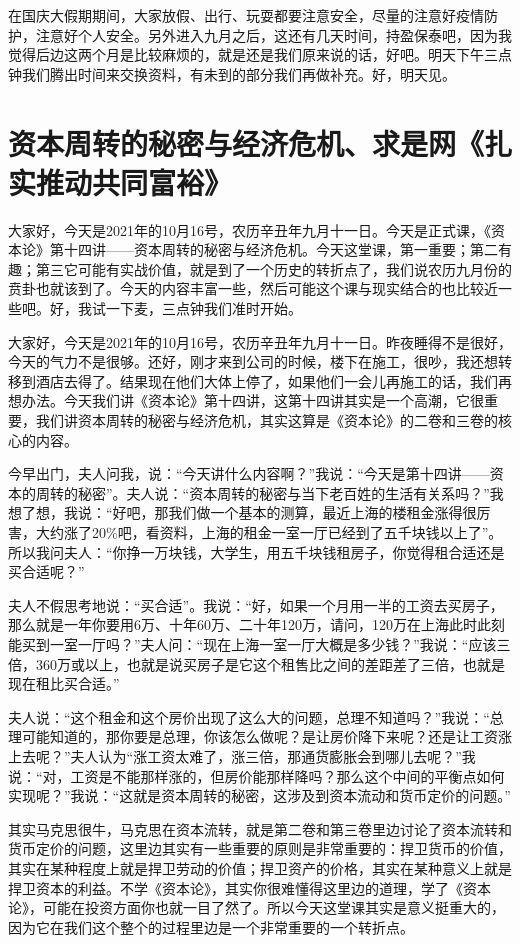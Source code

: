 \documentclass[UTF8, 12pt, a4paper]{ctexrep}
\begin{document}
在国庆大假期期间，大家放假、出行、玩耍都要注意安全，尽量的注意好疫情防护，注意好个人安全。另外进入九月之后，这还有几天时间，持盈保泰吧，因为我觉得后边这两个月是比较麻烦的，就是还是我们原来说的话，好吧。明天下午三点钟我们腾出时间来交换资料，有未到的部分我们再做补充。好，明天见。

\section{资本周转的秘密与经济危机、求是网《扎实推动共同富裕》}

大家好，今天是2021年的10月16号，农历辛丑年九月十一日。今天是正式课，《资本论》第十四讲——资本周转的秘密与经济危机。今天这堂课，第一重要；第二有趣；第三它可能有实战价值，就是到了一个历史的转折点了，我们说农历九月份的贲卦也就该到了。今天的内容丰富一些，然后可能这个课与现实结合的也比较近一些吧。好，我试一下麦，三点钟我们准时开始。

大家好，今天是2021年的10月16号，农历辛丑年九月十一日。昨夜睡得不是很好，今天的气力不是很够。还好，刚才来到公司的时候，楼下在施工，很吵，我还想转移到酒店去得了。结果现在他们大体上停了，如果他们一会儿再施工的话，我们再想办法。今天我们讲《资本论》第十四讲，这第十四讲其实是一个高潮，它很重要，我们讲资本周转的秘密与经济危机，其实这算是《资本论》的二卷和三卷的核心的内容。

今早出门，夫人问我，说：“今天讲什么内容啊？”我说：“今天是第十四讲——资本的周转的秘密”。夫人说：“资本周转的秘密与当下老百姓的生活有关系吗？”我想了想，我说：“好吧，那我们做一个基本的测算，最近上海的楼租金涨得很厉害，大约涨了20\%吧，看资料，上海的租金一室一厅已经到了五千块钱以上了”。所以我问夫人：“你挣一万块钱，大学生，用五千块钱租房子，你觉得租合适还是买合适呢？”

夫人不假思考地说：“买合适”。我说：“好，如果一个月用一半的工资去买房子，那么就是一年你要用6万、十年60万、二十年120万，请问，120万在上海此时此刻能买到一室一厅吗？”夫人问：“现在上海一室一厅大概是多少钱？”我说：“应该三倍，360万或以上，也就是说买房子是它这个租售比之间的差距差了三倍，也就是现在租比买合适。”

夫人说：“这个租金和这个房价出现了这么大的问题，总理不知道吗？”我说：“总理可能知道的，那你要是总理，你该怎么做呢？是让房价降下来呢？还是让工资涨上去呢？”夫人认为“涨工资太难了，涨三倍，那通货膨胀会到哪儿去呢？”我说：“对，工资是不能那样涨的，但房价能那样降吗？那么这个中间的平衡点如何实现呢？”我说：“这就是资本周转的秘密，这涉及到资本流动和货币定价的问题。”

其实马克思很牛，马克思在资本流转，就是第二卷和第三卷里边讨论了资本流转和货币定价的问题，这里边其实有一些重要的原则是非常重要的：捍卫货币的价值，其实在某种程度上就是捍卫劳动的价值；捍卫资产的价格，其实在某种意义上就是捍卫资本的利益。不学《资本论》，其实你很难懂得这里边的道理，学了《资本论》，可能在投资方面你也就一目了然了。所以今天这堂课其实是意义挺重大的，因为它在我们这个整个的过程里边是一个非常重要的一个转折点。
\end{document}

